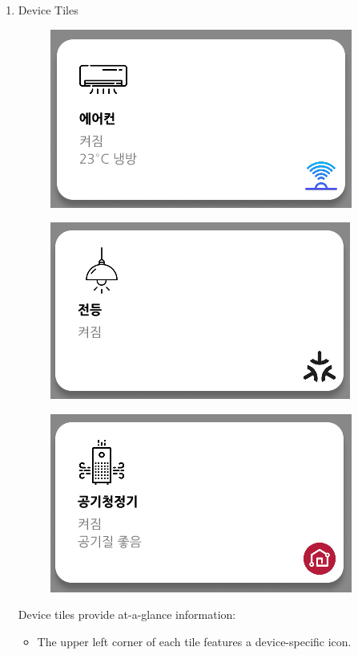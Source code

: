 \documentclass[conference]{IEEEtran}
\begin{document}
\begin{enumerate}[label=\arabic*.]
\begin{enumerate}[label=\alph*.]
\item Device Tiles\\
\begin{figure}[H]\centering \includegraphics[scale=0.6]{images/sw-spec-6.png}\end{figure}
\begin{figure}[H]\centering \includegraphics[scale=0.6]{images/sw-spec-7.png}\end{figure}
\begin{figure}[H]\centering \includegraphics[scale=0.6]{images/sw-spec-8.png}\end{figure}
Device tiles provide at-a-glance information:\\
\begin{itemize}
\item The upper left corner of each tile features a device-specific icon.\\

\end{itemize}
\end{enumerate}
\end{enumerate}
\end{document}
